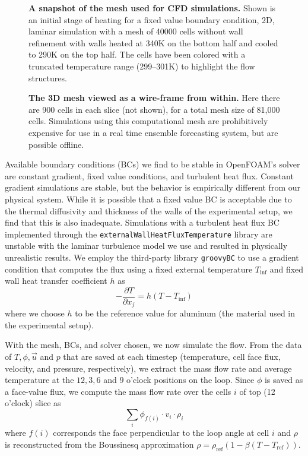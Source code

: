 \documentclass[10pt,letterpaper]{article}
\newcommand{\partialdiff}[2]{\frac{\partial #1}{\partial #2}}
\newcommand{\rhoref}{\rho_{\text{ref}}}
\begin{document}
\begin{figure}[h]
  \centering
  \caption[A snapshot of the mesh used for CFD simulations]{
\textbf{    A snapshot of the mesh used for CFD simulations.
}    Shown is an initial stage of heating for a fixed value boundary condition, 2D, laminar simulation with a mesh of 40000 cells without wall refinement with walls heated at 340K on the bottom half and cooled to 290K on the top half.
    The cells have been colored with a truncated temperature range (299--301K) to highlight the flow structures.
  }
  \label{fig:CFDmesh1}
\end{figure}

\begin{figure}[h]
  \centering
  \caption[The 3D mesh viewed as a wire-frame from within]{
\textbf{    The 3D mesh viewed as a wire-frame from within.
}    Here there are 900 cells in each slice (not shown), for a total mesh size of 81,000 cells.
    Simulations using this computational mesh are prohibitively expensive for use in a real time ensemble forecasting system, but are possible offline.
  }
  \label{fig:CFDmesh2}
\end{figure}

Available boundary conditions (BCs) we find to be stable in OpenFOAM's solver are constant gradient, fixed value conditions, and turbulent heat flux.
Constant gradient simulations are stable, but the behavior is empirically different from our physical system.
While it is possible that a fixed value BC is acceptable due to the thermal diffusivity and thickness of the walls of the experimental setup, we find that this is also inadequate.
Simulations with a turbulent heat flux BC implemented through the \verb|externalWallHeatFluxTemperature| library are unstable with the laminar turbulence model we use and resulted in physically unrealistic results.
We employ the third-party library \verb|groovyBC| to use a gradient condition that computes the flux using a fixed external temperature $T_\text{inf}$ and fixed wall heat transfer coefficient $h$ as $$ - \partialdiff{T}{x_j} = h \left( T-T_\text{inf} \right)$$ where we choose $h$ to be the reference value for aluminum (the material used in the experimental setup).

With the mesh, BCs, and solver chosen, we now simulate the flow.
From the data of $T,\phi,\vec{u}$ and $p$ that are saved at each timestep (temperature, cell face flux, velocity, and pressure, respectively), we extract the mass flow rate and average temperature at the $12,3,6$ and $9$ o'clock positions on the loop.
Since $\phi$ is saved as a face-value flux, we compute the mass flow rate over the cells $i$ of top (12 o'clock) slice as
\begin{equation} \sum _i\phi_{f(i)} \cdot v_i \cdot \rho_i\end{equation}
where $f(i)$ corresponds the face perpendicular to the loop angle at cell $i$ and $\rho$ is reconstructed from the Boussinesq approximation $\rho = \rhoref (1-\beta(T-T_\text{ref}))$.
\end{document}
